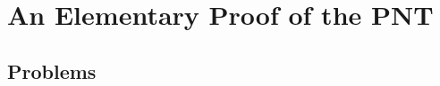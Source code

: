 \documentclass[12pt]{amsbook}
\begin{document}
\chapter{An Elementary Proof of the PNT}



\section{Problems}









\end{document}
